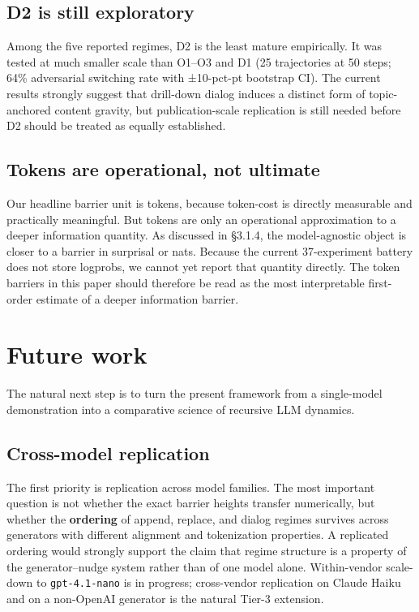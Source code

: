 \documentclass{article}
\theoremstyle{plain}
\theoremstyle{definition}
\begin{document}
\subsection{D2 is still exploratory}

Among the five reported regimes, D2 is the least mature empirically.
It was tested at much smaller scale than O1–O3 and D1 (25
trajectories at 50 steps; 64\% adversarial switching rate with
±10-pct-pt bootstrap CI). The current results strongly suggest that
drill-down dialog induces a distinct form of topic-anchored content
gravity, but publication-scale replication is still needed before D2
should be treated as equally established.

\subsection{Tokens are operational, not ultimate}

Our headline barrier unit is tokens, because token-cost is directly
measurable and practically meaningful. But tokens are only an
operational approximation to a deeper information quantity. As
discussed in §3.1.4, the model-agnostic object is closer to a barrier
in surprisal or nats. Because the current 37-experiment battery does
not store logprobs, we cannot yet report that quantity directly. The
token barriers in this paper should therefore be read as the most
interpretable first-order estimate of a deeper information barrier.


\section{Future work}

The natural next step is to turn the present framework from a
single-model demonstration into a comparative science of recursive
LLM dynamics.

\subsection{Cross-model replication}

The first priority is replication across model families. The most
important question is not whether the exact barrier heights transfer
numerically, but whether the \textbf{ordering} of append, replace, and
dialog regimes survives across generators with different alignment
and tokenization properties. A replicated ordering would strongly
support the claim that regime structure is a property of the
generator–nudge system rather than of one model alone. Within-vendor
scale-down to \texttt{gpt-4.1-nano} is in progress; cross-vendor replication
on Claude Haiku and on a non-OpenAI generator is the natural Tier-3
extension.
\end{document}
